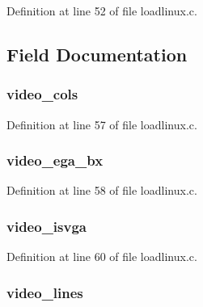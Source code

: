 \-Definition at line 52 of file loadlinux.\-c.



\subsection{\-Field \-Documentation}
\hypertarget{structatag__videotext_abd7a24d04c2e3a051bd316e44d025bbd}{
\subsubsection[{video\-\_\-cols}]{ {\bf video\-\_\-cols}}}\label{structatag__videotext_abd7a24d04c2e3a051bd316e44d025bbd}


\-Definition at line 57 of file loadlinux.\-c.

\hypertarget{structatag__videotext_a4fd68ac4ef39d5a73df67c42479b7380}{
\subsubsection[{video\-\_\-ega\-\_\-bx}]{ {\bf video\-\_\-ega\-\_\-bx}}}\label{structatag__videotext_a4fd68ac4ef39d5a73df67c42479b7380}


\-Definition at line 58 of file loadlinux.\-c.

\hypertarget{structatag__videotext_a8705641c3e6bd566573a2afe3bb66569}{
\subsubsection[{video\-\_\-isvga}]{ {\bf video\-\_\-isvga}}}\label{structatag__videotext_a8705641c3e6bd566573a2afe3bb66569}


\-Definition at line 60 of file loadlinux.\-c.

\hypertarget{structatag__videotext_a63e3f823f9549fdb1ad1237f128afc56}{
\subsubsection[{video\-\_\-lines}]{ {\bf video\-\_\-lines}}}\label{structatag__videotext_a63e3f823f9549fdb1ad1237f128afc56}


